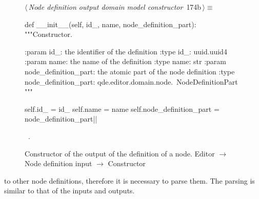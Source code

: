 \documentclass[%
    a4paper,    %
    justified,  %
    nobib,      %
    openany     %
]{tufte-book}
\makeatletter
\renewcommand{\label}[1]{\@tufte@label{##1}}%
\makeatother
\begin{document}
\begin{figure}[!htbp]
\begin{flushleft} \small
\begin{minipage}{\linewidth}\label{scrap145}\raggedright\small
{} $\langle\,${\itshape Node definition output domain model constructor}\nobreak\ {\footnotesize {174b}}$\,\rangle\equiv$
\vspace{-1ex}
\begin{pythoncode}
def __init__(self, id_, name, node_definition_part):
    """Constructor.

    :param id_: the identifier of the definition
    :type  id_: uuid.uuid4
    :param name: the name of the definition
    :type  name: str
    :param node_definition_part: the atomic part of the node
                                 definition
    :type node_definition_part: qde.editor.domain.node.\
                                NodeDefinitionPart
    """

    self.id_                  = id_
    self.name                 = name
    self.node_definition_part = node_definition_part|\NWsep|
\end{pythoncode}
\vspace{1.5ex}
\footnotesize
\begin{list}{}{\setlength{\itemsep}{-\parsep}\setlength{\itemindent}{-\leftmargin}}
\item \NWtxtMacroRefIn\ \NWlink{nuweb174a}{174a}.

\item{}
\end{list}
\end{minipage}\vspace{4ex}
\end{flushleft}
\caption{Constructor of the output of the definition of a node.
  \newline{}\newline{}Editor $\rightarrow$ Node definition input $\rightarrow$
  Constructor}
\end{figure}

 to other node definitions,
therefore it is necessary to parse them. The parsing is similar to that of the
inputs and outputs.
\end{document}
